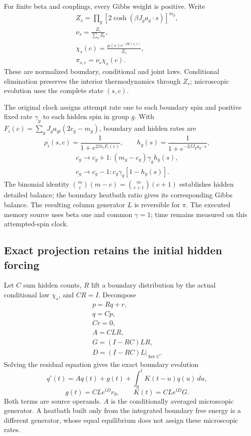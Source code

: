 For finite beta and couplings, every Gibbs weight is positive. Write
\[
\begin{gathered}
Z_s=\prod_g[2\cosh(\beta J_ga_g\cdot s)]^{m_g},\\
\nu_s=\frac{Z_s}{\sum_bZ_b},\\
\chi_s(c)=\frac{\mu(c)e^{-\beta E(s,c)}}{Z_s},\\
\pi_{s,c}=\nu_s\chi_s(c).
\end{gathered}
\]
These are normalized boundary, conditional and joint laws. Conditional
elimination preserves the interior thermodynamics through \(Z_s\);
microscopic evolution uses the complete state \((s,c)\).

The original clock assigns attempt rate one to each boundary spin and
positive fixed rate \(\gamma_g\) to each hidden spin in group \(g\).
With \(F_i(c)=\sum_gJ_ga_{gi}(2c_g-m_g)\), boundary and hidden rates are
\[
 \rho_i(s,c)=\frac1{1+e^{2\beta s_iF_i(c)}},\qquad
 h_g(s)=\frac1{1+e^{-2\beta J_ga_g\cdot s}},
\]
\[
\begin{gathered}
c_g\longrightarrow c_g+1:
      (m_g-c_g)\gamma_gh_g(s),\\
c_g\longrightarrow c_g-1:
      c_g\gamma_g[1-h_g(s)].
\end{gathered}
\]
The binomial identity
\({m\choose c}(m-c)={m\choose c+1}(c+1)\) establishes hidden detailed
balance; the boundary heatbath ratio gives its corresponding Gibbs
balance. The resulting column generator \(L\) is reversible for \(\pi\).
The executed memory source uses beta one and common \(\gamma=1\);
time remains measured on this attempted-spin clock.

\subsection{Exact projection retains the initial hidden forcing}

Let \(C\) sum hidden counts, \(R\) lift a boundary distribution by the
actual conditional law \(\chi_s\), and \(CR=I\). Decompose
\[
\begin{gathered}
p=Rq+r,\\
q=Cp,\\
Cr=0,\\
A=CLR,\\
G=(I-RC)LR,\\
D=(I-RC)L\big|_{\ker C}.
\end{gathered}
\]
Solving the residual equation gives the exact boundary evolution
\[
 q'(t)=Aq(t)+g(t)+\int_0^tK(t-u)q(u)\,du,
\]
\[
 g(t)=CLe^{tD}r_0,\qquad K(t)=CLe^{tD}G.
\]
Both terms are source operands. \(A\) is the conditionally averaged
microscopic generator. A heatbath built only from the integrated
boundary free energy is a different generator, whose equal equilibrium
does not assign these microscopic rates.

